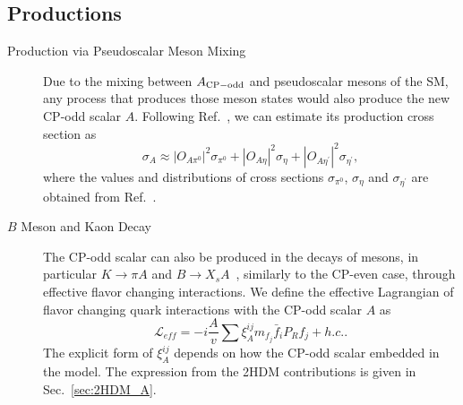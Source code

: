 \documentclass[letterpaper,11pt]{article}
\begin{document}
\subsection{Productions}
\label{sec:cp-odd-pro}

\begin{description}
\item[Production via Pseudoscalar Meson Mixing]    
Due to the mixing between $A_{\rm CP-odd}$ and pseudoscalar mesons of the SM,
any process that produces those meson states would also produce the new CP-odd scalar $A$. Following Ref.~\cite{FASER:2018eoc}, we can estimate its production cross section as
\begin{equation}
\label{eq:Apro}
\sigma_A \approx |O_{A\pi^0}|^2 \sigma_{\pi^0} +|O_{A\eta}|^2 \sigma_\eta+|O_{A\eta^\prime}|^2 \sigma_{\eta^\prime},
\end{equation}
where the values and distributions of cross sections $\sigma_{\pi^0}$, $\sigma_\eta$ and $\sigma_{\eta^\prime}$ are obtained from Ref.~\cite{Kling:2021fwx}.

\item[$B$ Meson and Kaon Decay]
The CP-odd scalar can also be produced in the decays of mesons, in particular $K \to \pi A$ and $B \to X_s A$~\cite{Dolan:2014ska}, similarly to the CP-even case, through effective flavor changing interactions.     We define the effective Lagrangian of flavor changing quark interactions with the CP-odd scalar $A$   as~\cite{Hall:1981bc, Frere:1981cc, Freytsis:2009ct, Batell:2009jf, Dolan:2014ska}   
\begin{equation}
    \mathcal{L}_{eff}
    =-i\frac{A}{v}\sum\xi^{ij}_{A}m_{f_j}\bar{f}_i P_R f_j+h.c..
    \label{eq:Lfceff_A}
\end{equation}
  The explicit form of $\xi_A^{ij}$ depends on how the CP-odd scalar embedded in the model.  The expression from the 2HDM contributions is given in Sec.~\ref{sec:2HDM_A}.   


\end{description}
\end{document}
